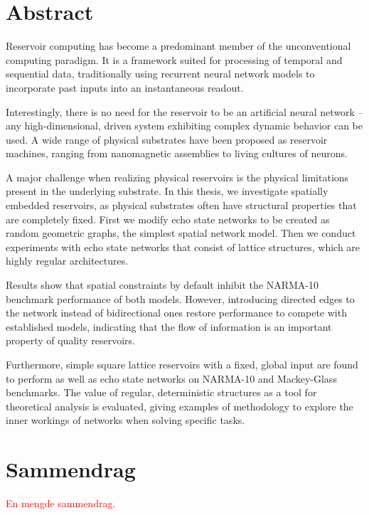 \chapter*{Abstract}

Reservoir computing has become a predominant member of the unconventional
computing paradigm. It is a framework suited for processing of temporal and
sequential data, traditionally using recurrent neural network models to
incorporate past inputs into an instantaneous readout.

Interestingly, there is no need for the reservoir to be an artificial neural
network -- any high-dimensional, driven system exhibiting complex dynamic
behavior can be used. A wide range of physical substrates have been proposed as
reservoir machines, ranging from nanomagnetic assemblies to living cultures of
neurons.

A major challenge when realizing physical reservoirs is the physical limitations
present in the underlying substrate. In this thesis, we investigate spatially
embedded reservoirs, as physical substrates often have structural properties
that are completely fixed. First we modify echo state networks to be created as
random geometric graphs, the simplest spatial network model. Then we conduct
experiments with echo state networks that consist of lattice structures, which
are highly regular architectures.

Results show that spatial constraints by default inhibit the NARMA-10 benchmark
performance of both models. However, introducing directed edges to the network
instead of bidirectional ones restore performance to compete with established
models, indicating that the flow of information is an important property of
quality reservoirs.

Furthermore, simple square lattice reservoirs with a fixed, global input are
found to perform as well as echo state networks on NARMA-10 and Mackey-Glass
benchmarks. The value of regular, deterministic structures as a tool for
theoretical analysis is evaluated, giving examples of methodology to explore the
inner workings of networks when solving specific tasks.

\chapter*{Sammendrag}

\textcolor{red}{
  En mengde sammendrag.
}

